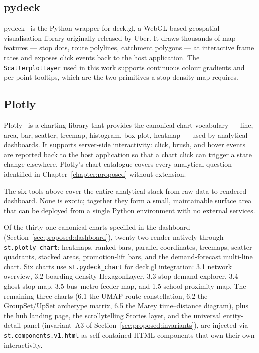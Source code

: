 \subsection{pydeck}
\label{sec:theory:pydeck}


\noindent
pydeck~\cite{pydeck} is the Python wrapper for deck.gl, a
WebGL-based geospatial visualisation library originally
released by Uber. It draws thousands of map features --- stop
dots, route polylines, catchment polygons --- at interactive
frame rates and exposes click events back to the host
application. The \texttt{ScatterplotLayer} used in this work
supports continuous colour gradients and per-point tooltips,
which are the two primitives a stop-density map requires.

\subsection{Plotly}
\label{sec:theory:plotly}


\noindent
Plotly~\cite{plotly} is a charting library that provides the
canonical chart vocabulary --- line, area, bar, scatter,
treemap, histogram, box plot, heatmap --- used by analytical
dashboards. It supports server-side interactivity: click,
brush, and hover events are reported back to the host
application so that a chart click can trigger a state change
elsewhere. Plotly's chart catalogue covers every analytical
question identified in Chapter~\ref{chapter:proposed} without
extension.

\bigskip

The six tools above cover the entire analytical stack from raw
data to rendered dashboard. None is exotic; together they form
a small, maintainable surface area that can be deployed from a
single Python environment with no external services.

Of the thirty-one canonical charts specified in the dashboard
(Section~\ref{sec:proposed:dashboard}), twenty-two render
natively through \texttt{st.plotly\_chart}: heatmaps, ranked
bars, parallel coordinates, treemaps, scatter quadrants, stacked
areas, promotion-lift bars, and the demand-forecast multi-line
chart. Six charts use \texttt{st.pydeck\_chart} for deck.gl
integration: 3.1 network overview, 3.2 boarding density
HexagonLayer, 3.3 stop demand explorer, 3.4 ghost-stop map, 3.5
bus--metro feeder map, and 1.5 school proximity map. The
remaining three charts (6.1 the UMAP route constellation, 6.2
the GroupSet/UpSet archetype matrix, 6.5 the Marey
time--distance diagram), plus the hub landing page, the
scrollytelling Stories layer, and the universal entity-detail
panel (invariant~A3 of Section~\ref{sec:proposed:invariants}),
are injected via \texttt{st.components.v1.html} as self-contained
HTML components that own their own interactivity.
